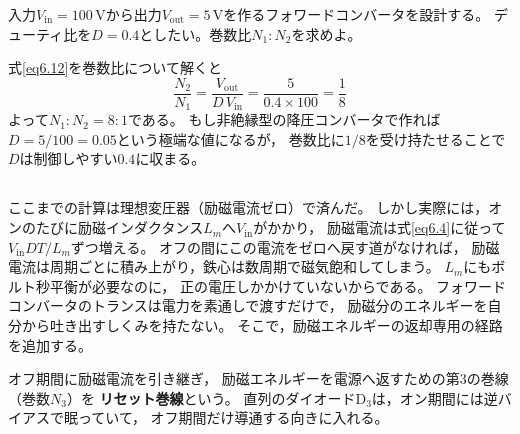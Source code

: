 \begin{例題}[フォワードコンバータの巻数比設計]
\label{rei6.1}
入力$V_{\mathrm{in}} = 100$\,Vから出力$V_{\mathrm{out}} = 5$\,Vを作るフォワードコンバータを設計する。
デューティ比を$D = 0.4$としたい。巻数比$N_1 : N_2$を求めよ。
\begin{解答}
式\ref{eq6.12}を巻数比について解くと
\begin{equation*}
\frac{N_2}{N_1} = \frac{V_{\mathrm{out}}}{D\,V_{\mathrm{in}}} = \frac{5}{0.4\times100} = \frac{1}{8}
\end{equation*}
よって$N_1 : N_2 = 8 : 1$である。
もし非絶縁型の降圧コンバータで作れば$D = 5/100 = 0.05$という極端な値になるが，
巻数比に$1/8$を受け持たせることで$D$は制御しやすい$0.4$に収まる。
\end{解答}
\end{例題}

\subsection{}

ここまでの計算は理想変圧器（励磁電流ゼロ）で済んだ。
しかし実際には，オンのたびに励磁インダクタンス$L_m$へ$V_{\mathrm{in}}$がかかり，
励磁電流は式\ref{eq6.4}に従って$V_{\mathrm{in}}DT/L_m$ずつ増える。
オフの間にこの電流をゼロへ戻す道がなければ，
励磁電流は周期ごとに積み上がり，鉄心は数周期で磁気飽和してしまう。
$L_m$にもボルト秒平衡が必要なのに，
正の電圧しかかけていないからである。
フォワードコンバータのトランスは電力を素通しで渡すだけで，
励磁分のエネルギーを自分から吐き出すしくみを持たない。
そこで，励磁エネルギーの返却専用の経路を追加する。

\begin{定義}[リセット巻線]
\label{def6.3}
オフ期間に励磁電流を引き継ぎ，
励磁エネルギーを電源へ返すための第3の巻線（巻数$N_3$）を
\textbf{リセット巻線}という。
直列のダイオード$\mathrm{D_3}$は，オン期間には逆バイアスで眠っていて，
オフ期間だけ導通する向きに入れる。
\end{定義}

